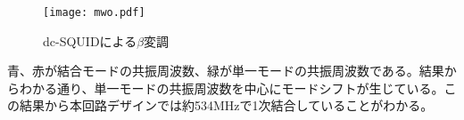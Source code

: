         \begin{figure}[H]
            \centering
            \texttt{[image: mwo.pdf]}
            \caption{dc-SQUIDによる$\beta$変調}
        \end{figure}
        青、赤が結合モードの共振周波数、緑が単一モードの共振周波数である。結果からわかる通り、単一モードの共振周波数を中心にモードシフトが生じている。この結果から本回路デザインでは約534MHzで1次結合していることがわかる。
